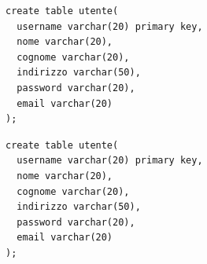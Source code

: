 

\vspace{1cm} %
\begin{verbatim}
create table utente(
  username varchar(20) primary key,
  nome varchar(20),
  cognome varchar(20),
  indirizzo varchar(50),
  password varchar(20),
  email varchar(20)
);
\end{verbatim}

\noindent{}
\newline\newline

\begin{verbatim}
create table utente(
  username varchar(20) primary key,
  nome varchar(20),
  cognome varchar(20),
  indirizzo varchar(50),
  password varchar(20),
  email varchar(20)
);
\end{verbatim}

\noindent{}
\newline\newline
